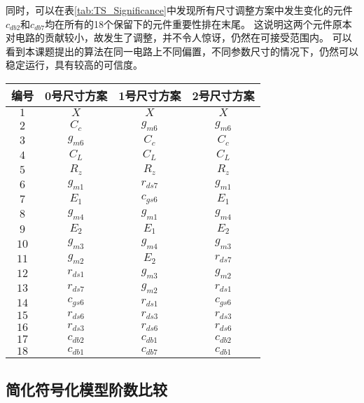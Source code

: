 同时，可以在表\ref{tab:TS_Significance}中发现所有尺寸调整方案中发生变化的元件$c_{db2}$和$c_{db7}$均在所有的18个保留下的元件重要性排在末尾。
这说明这两个元件原本对电路的贡献较小，故发生了调整，并不令人惊讶，仍然在可接受范围内。
可以看到本课题提出的算法在同一电路上不同偏置，不同参数尺寸的情况下，仍然可以稳定运行，具有较高的可信度。

\begin{table}[!htbp]
	\centering
	\begin{tabular}{c|c|c|c}
		\hline
		 编号  &  0号尺寸方案   &  1号尺寸方案   &  2号尺寸方案   \\ \hline
		$1$  &    $X$    &    $X$    &    $X$    \\
		$2$  &  $C_{c}$  & $g_{m6}$  & $g_{m6}$  \\
		$3$  & $g_{m6}$  &  $C_{c}$  &  $C_{c}$  \\
		$4$  &  $C_{L}$  &  $C_{L}$  &  $C_{L}$  \\
		$5$  &  $R_{z}$  &  $R_{z}$  &  $R_{z}$  \\
		$6$  & $g_{m1}$  & $r_{ds7}$ & $g_{m1}$  \\
		$7$  &  $E_{1}$  & $c_{gs6}$ &  $E_{1}$  \\
		$8$  & $g_{m4}$  & $g_{m1}$  & $g_{m4}$  \\
		$9$  &  $E_{2}$  &  $E_{1}$  &  $E_{2}$  \\
		$10$ & $g_{m3}$  & $g_{m4}$  & $g_{m3}$  \\
		$11$ & $g_{m2}$  &  $E_{2}$  & $r_{ds7}$ \\
		$12$ & $r_{ds1}$ & $g_{m3}$  & $g_{m2}$  \\
		$13$ & $r_{ds7}$ & $g_{m2}$  & $r_{ds1}$ \\
		$14$ & $c_{gs6}$ & $r_{ds1}$ & $c_{gs6}$ \\
		$15$ & $r_{ds6}$ & $r_{ds3}$ & $r_{ds3}$ \\
		$16$ & $r_{ds3}$ & $r_{ds6}$ & $r_{ds6}$ \\
		$17$ & $c_{db2}$ & $c_{db1}$ & $c_{db2}$ \\
		$18$ & $c_{db1}$ & $c_{db7}$ & $c_{db1}$ \\ \hline
	\end{tabular}
\end{table}

\subsection{简化符号化模型阶数比较}
\label{subsec:simp:res:order}

